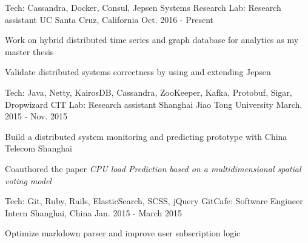 

\begin{cventries}

  \cventry
    {Tech: Cassandra, Docker, Consul, Jepsen} %
    {Systems Research Lab: Research assistant} %
    {UC Santa Cruz, California} %
    {Oct. 2016 - Present} %
    {
      \begin{cvitems} %
        \item {Work on hybrid distributed time series and graph database for analytics as my master thesis}
        \item {Validate distributed systems correctness by using and extending Jepsen}
      \end{cvitems}
    }

    \cventry
      {Tech: Java, Netty, KairosDB, Cassandra, ZooKeeper, Kafka, Protobuf, Sigar, Dropwizard} %
      {CIT Lab: Research assistant} %
      {Shanghai Jiao Tong University} %
      {March. 2015 - Nov. 2015} %
      {
        \begin{cvitems} %
          \item {Build a distributed system monitoring and predicting prototype with China Telecom Shanghai}
          \item {Coauthored the paper \textit{CPU load Prediction based on a multidimensional spatial voting model}}
        \end{cvitems}
      }


  \cventry
    {Tech: Git, Ruby, Rails, ElasticSearch, SCSS, jQuery} %
    {GitCafe: Software Engineer Intern} %
    {Shanghai, China} %
    {Jan. 2015 - March 2015} %
    {
      \begin{cvitems} %
        \item {Optimize markdown parser and improve user subscription logic}
      \end{cvitems}
    }


\end{cventries}
